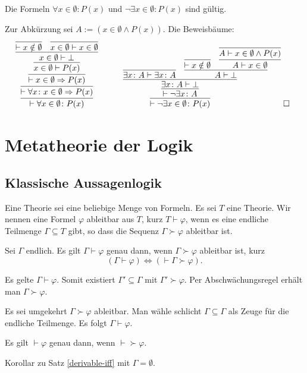 \newpage
\begin{Satz}\newlinefirst
Die Formeln $\forall x\in\emptyset\colon P(x)$ und $\neg\exists x\in\emptyset\colon P(x)$
sind gültig.
\end{Satz}
\begin{Beweis}
Zur Abkürzung sei $A:=(x\in\emptyset\land P(x))$. Die Beweisbäume:
\[
\begin{array}{@{}l@{\qquad\quad}l}
\infer{\vdash\forall x\in\emptyset\colon P(x)}{
  \infer{\vdash\forall x\colon x\in\emptyset\Rightarrow P(x)}{
    \infer{\vdash x\in\emptyset\Rightarrow P(x)}{
      \infer{x\in\emptyset\vdash P(x)}{
        \infer{x\in\emptyset\vdash\bot}{
          \infer{\vdash x\notin\emptyset}{}
        & \infer{x\in\emptyset\vdash x\in\emptyset}{}}}}}}
&
\infer{\vdash\neg\exists x\in\emptyset\colon P(x)}{
  \infer{\vdash\neg\exists x\colon A}{
    \infer{\exists x\colon A\vdash\bot}{
      \infer{\exists x\colon A\vdash\exists x\colon A}{}
    & \infer{A\vdash\bot}{
        \infer{\vdash x\notin\emptyset}{}
      & \infer{A\vdash x\in\emptyset}{
          \infer{A\vdash x\in\emptyset\land P(x)}{}}}}}}\;\qedsymbol
\end{array}
\]
\end{Beweis}

\section{Metatheorie der Logik}
\subsection{Klassische Aussagenlogik}

\begin{Definition}\newlinefirst
Eine Theorie sei eine beliebige Menge von Formeln.
Es sei $T$ eine Theorie. Wir nennen eine Formel $\varphi$ ableitbar aus
$T$, kurz $T\vdash\varphi$, wenn es eine endliche Teilmenge
$\Gamma\subseteq T$ gibt, so dass die Sequenz $\Gamma\succ\varphi$
ableitbar ist.
\end{Definition}
\begin{Satz}\label{derivable-iff}
Sei $\Gamma$ endlich. Es gilt $\Gamma\vdash\varphi$ genau dann,
wenn $\Gamma\succ\varphi$ ableitbar ist, kurz
\[(\Gamma\vdash\varphi) \iff (\vdash \Gamma\succ\varphi).\]
\end{Satz}
\begin{Beweis}
Es gelte $\Gamma\vdash\varphi$. Somit existiert
$\Gamma'\subseteq\Gamma$ mit $\Gamma'\succ\varphi$.
Per Abschwächungsregel erhält man $\Gamma\succ\varphi$.

Es sei umgekehrt $\Gamma\succ\varphi$ ableitbar. Man wähle schlicht
$\Gamma\subseteq\Gamma$ als Zeuge für die endliche Teilmenge.
Es folgt $\Gamma\vdash\varphi$.\,\qedsymbol
\end{Beweis}
\begin{Satz}
Es gilt $\vdash\varphi$ genau dann, wenn $\vdash\succ\varphi$.
\end{Satz}
\begin{Beweis}
Korollar zu Satz \ref{derivable-iff} mit $\Gamma=\emptyset$.
\end{Beweis}

